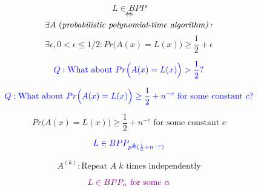 \begin{frame}
  \begin{definition}
	\[
	  L \in BPP
	\]
	\[
	  \iff
	\]
	\[
	  \exists A \text{ (\it probabilistic polynomial-time algorithm)}: 
	\]
	\[
	  \exists \epsilon, 0 < \epsilon \le 1/2: Pr\Big(A(x) = L(x)\Big) \ge \frac{1}{2} + \epsilon
	\]
  \end{definition}

  \begin{center}
  \end{center}

  \pause
  \[
	\textcolor{blue}{Q: \text{What about } Pr\Big(A(x) = L(x)\Big) > \frac{1}{2}?}
  \]

  \pause
  \vspace{-0.50cm}
  \[
	\textcolor{blue}{Q: \text{What about } Pr\Big(A(x) = L(x)\Big) \ge \frac{1}{2} + n^{-c} \text{ for some constant } c?}
  \]
\end{frame}

\begin{frame}
  \[
	Pr\Big(A(x) = L(x)\Big) \ge \frac{1}{2} + n^{-c} \text{ for some constant } c
  \]

  \pause
  \[
	\textcolor{blue}{L \in BPP_{p \triangleq (\frac{1}{2} + n^{-c})}}
  \]

  \pause
  \[
	A^{(k)}: \text{Repeat } A\; k \text{ times independently}
  \]

  \pause
  \begin{center}
  \end{center}

  \pause
  \[
	\textcolor{violet}{L \in BPP_{\alpha} \text{ for some } \alpha}
  \]
\end{frame}

